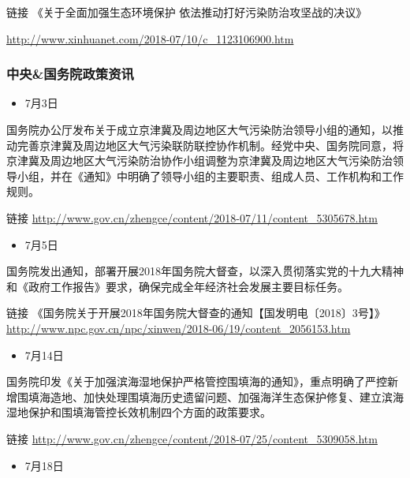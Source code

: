 \documentclass[]{book}
\providecommand{\tightlist}{%
  \setlength{\itemsep}{0pt}\setlength{\parskip}{0pt}}
\begin{document}
链接 《关于全面加强生态环境保护 依法推动打好污染防治攻坚战的决议》

\url{http://www.xinhuanet.com/2018-07/10/c_1123106900.htm}

\hypertarget{ux4e2dux592eux56fdux52a1ux9662ux653fux7b56ux8d44ux8baf-3}{%
\subsubsection*{中央\&国务院政策资讯}\label{ux4e2dux592eux56fdux52a1ux9662ux653fux7b56ux8d44ux8baf-3}}

\begin{itemize}
\tightlist
\item
  7月3日
\end{itemize}

国务院办公厅发布关于成立京津冀及周边地区大气污染防治领导小组的通知，以推动完善京津冀及周边地区大气污染联防联控协作机制。经党中央、国务院同意，将京津冀及周边地区大气污染防治协作小组调整为京津冀及周边地区大气污染防治领导小组，并在《通知》中明确了领导小组的主要职责、组成人员、工作机构和工作规则。

链接 \url{http://www.gov.cn/zhengce/content/2018-07/11/content_5305678.htm}

\begin{itemize}
\tightlist
\item
  7月5日
\end{itemize}

国务院发出通知，部署开展2018年国务院大督查，以深入贯彻落实党的十九大精神和《政府工作报告》要求，确保完成全年经济社会发展主要目标任务。

链接 《国务院关于开展2018年国务院大督查的通知【国发明电〔2018〕3号】》\url{http://www.npc.gov.cn/npc/xinwen/2018-06/19/content_2056153.htm}

\begin{itemize}
\tightlist
\item
  7月14日
\end{itemize}

国务院印发《关于加强滨海湿地保护严格管控围填海的通知》，重点明确了严控新增围填海造地、加快处理围填海历史遗留问题、加强海洋生态保护修复、建立滨海湿地保护和围填海管控长效机制四个方面的政策要求。

链接 \url{http://www.gov.cn/zhengce/content/2018-07/25/content_5309058.htm}

\begin{itemize}
\tightlist
\item
  7月18日
\end{itemize}
\end{document}
